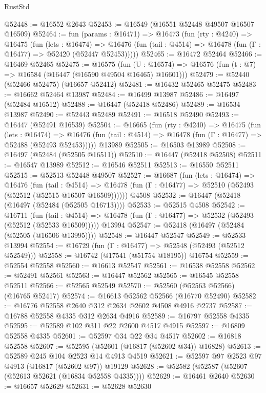 \begin{lexlean}{RustStd}
\begin{coremodule}
@52448 := @16552 @2643
@52453 := @16549 (@16551 @52448 @49507 @16507 @16509)
@52464 := fun (params : @16471) =>
  @16473
    (fun (rty : @4240) =>
    @16475
      (fun (lets : @16474) =>
      @16476 (fun (tail : @4514) => @16478 (fun (Γ : @16477) => @52420 (@52447 @52453)))))
@52465 := @16472 @52464
@52466 := @16469 @52465
@52475 := @16575
    (fun (U : @16574) => @16576 (fun (t : @7) => @16584 (@16447 (@16590 @49504 @16465) @16601)))
@52479 := @52440 (@52466 @52475) (@16657 @52412)
@52481 := @16432 @52465 @52475
@52483 := @16662 @52464 @13987
@52484 := @16499 @13987
@52486 := @16497 (@52484 @16512)
@52488 := @16447 (@52418 @52486)
@52489 := @16534 @13987
@52490 := @52443 @52489
@52491 := @16518 @52490
@52493 := @16447 (@52491 @16539)
@52504 := @16665
    (fun (rty : @4240) =>
    @16475
      (fun (lets : @16474) =>
      @16476 (fun (tail : @4514) => @16478 (fun (Γ : @16477) => @52488 (@52493 @52453)))))
    @13989
@52505 := @16503 @13989
@52508 := @16497 (@52484 (@52505 @16511))
@52510 := @16447 (@52418 @52508)
@52511 := @16547 @13989
@52512 := @16546 @52511
@52513 := @16550 @52511
@52515 := @52513 @52448 @49507
@52527 := @16687
    (fun (lets : @16474) =>
    @16476
      (fun (tail : @4514) =>
      @16478 (fun (Γ : @16477) => @52510 (@52493 (@52512 (@52515 @16507 @16509))))))
    @4508
@52532 := @16447 (@52418 (@16497 (@52484 (@52505 @16713))))
@52533 := @52515 @4508
@52542 := @16711
    (fun (tail : @4514) => @16478 (fun (Γ : @16477) => @52532 (@52493 (@52512 (@52533 @16509)))))
    @13994
@52547 := @52418 (@16497 (@52484 (@52505 (@16506 @13995))))
@52548 := @16447 @52547
@52549 := @52533 @13994
@52554 := @16729 (fun (Γ : @16477) => @52548 (@52493 (@52512 @52549)))
@52558 := @16742 (@17541 (@51754 @18195)) @16754
@52559 := @52554 @52558
@52560 := @16613 @52547
@52561 := @16538 @52558
@52562 := @52491 @52561
@52563 := @16447 @52562
@52565 := @16545 @52558 @52511
@52566 := @52565 @52549
@52570 := @52560 (@52563 @52566) (@16765 @52417)
@52574 := @16613 @52562 @52566 (@16770 @52490)
@52582 := @16776 @52558 @2640 @312 @2634 @2602 @4508 @4916 @2737
@52587 := @16788 @52558 @4335 @312 @2634 @4916
@52589 := @16797 @52558 @4335
@52595 := @52589 @102 @311 @22 @2600 @4517 @4915
@52597 := @16809 @52558 @4335
@52601 := @52597 @34 @22 @34 @4517
@52602 := @16818 @52558
@52607 := @52595 (@52601 (@16817 (@52602 @34)) @16828)
@52613 := @52589 @245 @104 @2523 @14 @4913 @4519
@52621 := @52597 @97 @2523 @97 @4913 (@16817 (@52602 @97)) @19129
@52628 := @52582 (@52587 (@52607 (@52613 @52621 (@16834 @52558 @4335))))
@52629 := @16461 @2640
@52630 := @16657 @52629
@52631 := @52628 @52630

\end{coremodule}
\end{lexlean}
